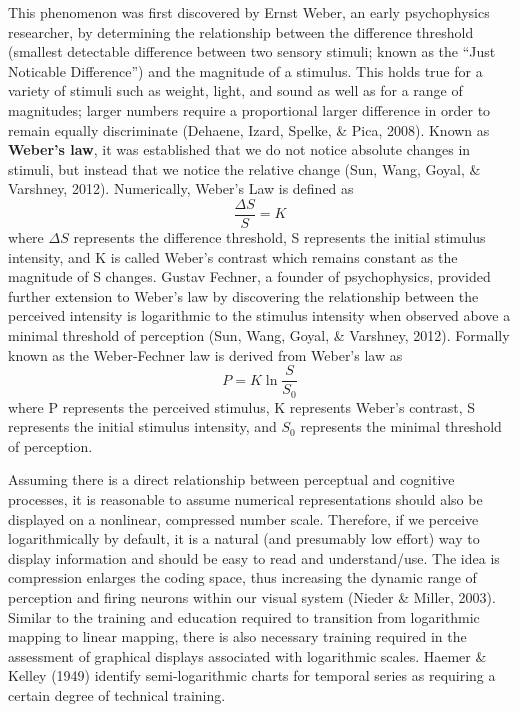 \documentclass[print]{nuthesis}
\begin{document}
This phenomenon was first discovered by Ernst Weber, an early psychophysics researcher, by determining the relationship between the difference threshold (smallest detectable difference between two sensory stimuli; known as the ``Just Noticable Difference'') and the magnitude of a stimulus.
This holds true for a variety of stimuli such as weight, light, and sound as well as for a range of magnitudes; larger numbers require a proportional larger difference in order to remain equally discriminate (Dehaene, Izard, Spelke, \& Pica, 2008).
Known as \textbf{Weber's law}, it was established that we do not notice absolute changes in stimuli, but instead that we notice the relative change (Sun, Wang, Goyal, \& Varshney, 2012).
Numerically, Weber's Law is defined as
\begin{equation}
\frac{\Delta S}{S} = K
\end{equation}
where \(\Delta S\) represents the difference threshold, S represents the initial stimulus intensity, and K is called Weber's contrast which remains constant as the magnitude of S changes.
Gustav Fechner, a founder of psychophysics, provided further extension to Weber's law by discovering the relationship between the perceived intensity is logarithmic to the stimulus intensity when observed above a minimal threshold of perception (Sun, Wang, Goyal, \& Varshney, 2012).
Formally known as the Weber-Fechner law is derived from Weber's law as
\begin{equation}
P = K\ln \frac{S}{S_0}
\end{equation}
where P represents the perceived stimulus, K represents Weber's contrast, S represents the initial stimulus intensity, and \(S_0\) represents the minimal threshold of perception.

Assuming there is a direct relationship between perceptual and cognitive processes, it is reasonable to assume numerical representations should also be displayed on a nonlinear, compressed number scale. Therefore, if we perceive logarithmically by default, it is a natural (and presumably low effort) way to display information and should be easy to read and understand/use.
The idea is compression enlarges the coding space, thus increasing the dynamic range of perception and firing neurons within our visual system (Nieder \& Miller, 2003).
Similar to the training and education required to transition from logarithmic mapping to linear mapping, there is also necessary training required in the assessment of graphical displays associated with logarithmic scales. Haemer \& Kelley (1949) identify semi-logarithmic charts for temporal series as requiring a certain degree of technical training.
\end{document}
